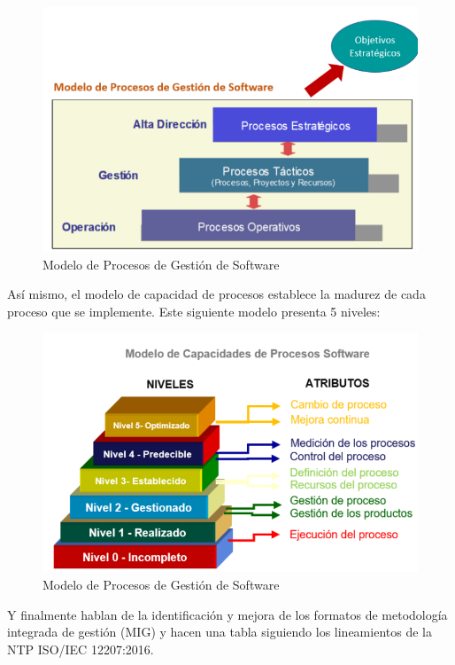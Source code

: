 \documentclass{article}
\begin{document}
\begin{figure}[!h]
    \centering
    \includegraphics[scale=.37]{caso1.png}
    \caption{Modelo de Procesos de Gestión de Software}
\end{figure}

Así mismo, el modelo de capacidad de procesos establece la madurez de cada
proceso que se implemente. Este siguiente modelo presenta 5 niveles:

\begin{figure}[!h]
    \centering
    \includegraphics[scale=.37]{caso2.png}
    \caption{Modelo de Procesos de Gestión de Software}
\end{figure}

Y finalmente hablan de la identificación y mejora de los formatos de metodología
integrada de gestión (MIG) y hacen una tabla siguiendo los lineamientos de la
NTP ISO/IEC 12207:2016.
\end{document}
